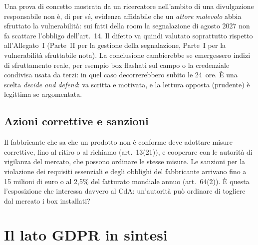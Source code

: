 \begin{integrazione}
Una prova di concetto mostrata da un ricercatore nell'ambito di una divulgazione responsabile non è,
di per sé, evidenza affidabile che un \emph{attore malevolo} abbia sfruttato la vulnerabilità: sui
fatti della room la segnalazione di agosto 2027 non fa scattare l'obbligo dell'art.~14. Il difetto va
quindi valutato soprattutto rispetto all'Allegato~I (Parte~II per la gestione della segnalazione,
Parte~I per la vulnerabilità sfruttabile nota). La conclusione cambierebbe se emergessero indizi di
sfruttamento reale, per esempio box flashati sul campo o la credenziale condivisa usata da terzi: in
quel caso decorrerebbero subito le 24~ore. È una scelta \emph{decide and defend}: va scritta e
motivata, e la lettura opposta (prudente) è legittima se argomentata.
\end{integrazione}

\subsection{Azioni correttive e sanzioni}
Il fabbricante che sa che un prodotto non è conforme deve adottare misure correttive, fino al ritiro o
al richiamo (art.~13(21)), e cooperare con le autorità di vigilanza del mercato, che possono ordinare
le stesse misure. Le sanzioni per la violazione dei requisiti essenziali e degli obblighi del
fabbricante arrivano fino a 15 milioni di euro o al 2,5\% del fatturato mondiale annuo
(art.~64(2)). È questa l'esposizione che interessa davvero al CdA: un'autorità può ordinare di
togliere dal mercato i box installati?

\section{Il lato GDPR in sintesi}

